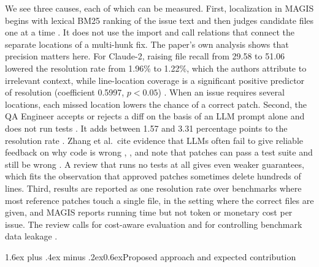 \documentclass[10pt,a4paper]{article}
\makeatletter
\renewcommand\section{\@startsection{section}{1}{\z@}%
  {1.6ex plus .4ex minus .2ex}{0.6ex}{\normalfont\normalsize\bfseries}}
\makeatother
\begin{document}
We see three causes, each of which can be measured. First, localization in MAGIS begins with lexical BM25 ranking of the issue text and then judges candidate files one at a time \cite[Alg.~1]{tao2024magis}. It does not use the import and call relations that connect the separate locations of a multi-hunk fix. The paper's own analysis shows that precision matters here. For Claude-2, raising file recall from 29.58 to 51.06 lowered the resolution rate from 1.96\% to 1.22\%, which the authors attribute to irrelevant context, while line-location coverage is a significant positive predictor of resolution (coefficient 0.5997, $p<0.05$) \cite[\S2]{tao2024magis}. When an issue requires several locations, each missed location lowers the chance of a correct patch. Second, the QA Engineer accepts or rejects a diff on the basis of an LLM prompt alone and does not run tests \cite[Alg.~3]{tao2024magis}. It adds between 1.57 and 3.31 percentage points to the resolution rate \cite[Table~2]{tao2024magis}. Zhang et al.\ cite evidence that LLMs often fail to give reliable feedback on why code is wrong \cite[\S8.4]{zhang2026slr}, \cite{olausson2024selfrepair}, and note that patches can pass a test suite and still be wrong \cite[\S8.3]{zhang2026slr}. A review that runs no tests at all gives even weaker guarantees, which fits the observation that approved patches sometimes delete hundreds of lines. Third, results are reported as one resolution rate over benchmarks where most reference patches touch a single file, in the setting where the correct files are given, and MAGIS reports running time but not token or monetary cost per issue. The review calls for cost-aware evaluation and for controlling benchmark data leakage \cite[\S9.2]{zhang2026slr}.

\section{Proposed approach and expected contribution}
\end{document}
